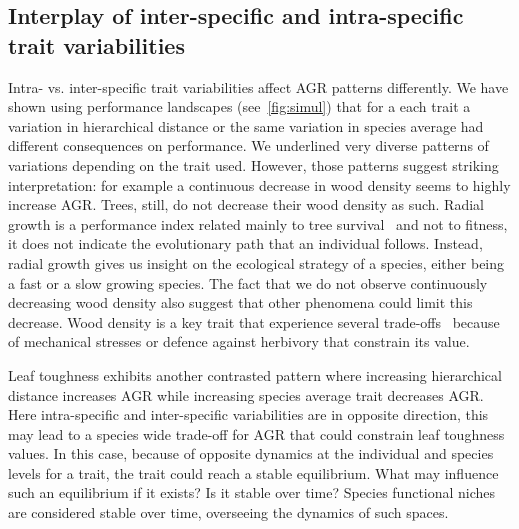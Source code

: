 \subsection*{Interplay of inter-specific and intra-specific trait variabilities}

Intra- vs. inter-specific trait variabilities affect AGR patterns differently. We have shown using performance landscapes (see~\autoref{fig:simul}) that for a each trait a variation in hierarchical distance or the same variation in species average had different consequences on performance. We underlined very diverse patterns of variations depending on the trait used. However, those patterns suggest striking interpretation: for example a continuous decrease in wood density seems to highly increase AGR. Trees, still, do not decrease their wood density as such. Radial growth is a performance index related mainly to tree survival~\citep{aubry-kientz_vigor_2015} and not to fitness, it does not indicate the evolutionary path that an individual follows. Instead, radial growth gives us insight on the ecological strategy of a species, either being a fast or a slow growing species. The fact that we do not observe continuously decreasing wood density also suggest that other phenomena could limit this decrease. Wood density is a key trait that experience several trade-offs~\citep{chave_towards_2009} because of mechanical stresses or defence against herbivory that constrain its value.

Leaf toughness exhibits another contrasted pattern where increasing hierarchical distance increases AGR while increasing species average trait decreases AGR. Here intra-specific and inter-specific variabilities are in opposite direction, this may lead to a species wide trade-off for AGR that could constrain leaf toughness values. In this case,  because of opposite dynamics at the individual and species levels for a trait, the trait could reach a stable equilibrium. What may influence such an equilibrium if it exists? Is it stable over time? Species functional niches are considered stable over time, overseeing the dynamics of such spaces.


